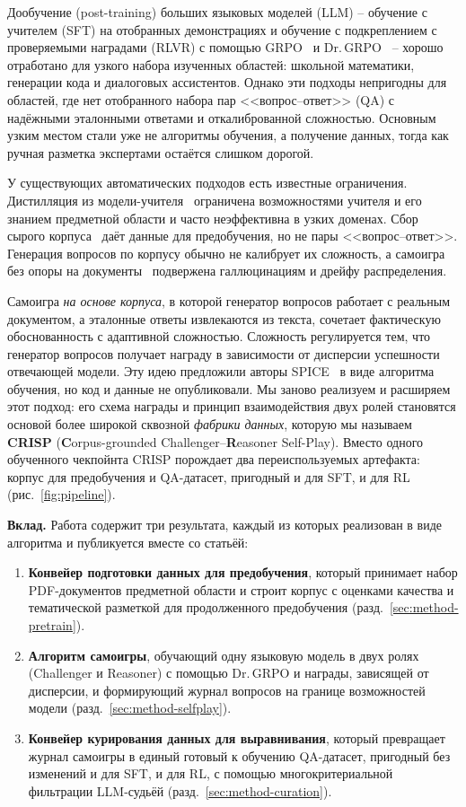 \documentclass{article}
\begin{document}
Дообучение (post-training) больших языковых моделей (LLM) -- обучение с учителем (SFT) на отобранных демонстрациях и обучение с подкреплением с проверяемыми наградами (RLVR) с помощью GRPO~\cite{shao2024deepseekmath} и Dr.\,GRPO~\cite{liu2025drgrpo} -- хорошо отработано для узкого набора изученных областей: школьной математики, генерации кода и диалоговых ассистентов. Однако эти подходы непригодны для областей, где нет отобранного набора пар <<вопрос--ответ>> (QA) с надёжными эталонными ответами и откалиброванной сложностью. Основным узким местом стали уже не алгоритмы обучения, а получение данных, тогда как ручная разметка экспертами остаётся слишком дорогой.

У существующих автоматических подходов есть известные ограничения. Дистилляция из модели-учителя~\cite{wang2022selfinstruct,xu2023wizardlm,luo2023wizardmath} ограничена возможностями учителя и его знанием предметной области и часто неэффективна в узких доменах. Сбор сырого корпуса~\cite{penedo2024fineweb} даёт данные для предобучения, но не пары <<вопрос--ответ>>. Генерация вопросов по корпусу обычно не калибрует их сложность, а самоигра без опоры на документы~\cite{huang2025rzero,zhao2025absolute} подвержена галлюцинациям и дрейфу распределения.

Самоигра \emph{на основе корпуса}, в которой генератор вопросов работает с реальным документом, а эталонные ответы извлекаются из текста, сочетает фактическую обоснованность с адаптивной сложностью. Сложность регулируется тем, что генератор вопросов получает награду в зависимости от дисперсии успешности отвечающей модели. Эту идею предложили авторы SPICE~\cite{spice} в виде алгоритма обучения, но код и данные не опубликовали. Мы заново реализуем и расширяем этот подход: его схема награды и принцип взаимодействия двух ролей становятся основой более широкой сквозной \emph{фабрики данных}, которую мы называем \textbf{CRISP} (\textbf{C}orpus-grounded Challenger--\textbf{R}easoner Self-Play). Вместо одного обученного чекпойнта CRISP порождает два переиспользуемых артефакта: корпус для предобучения и QA-датасет, пригодный и для SFT, и для RL (рис.~\ref{fig:pipeline}).

\textbf{Вклад.} Работа содержит три результата, каждый из которых реализован в виде алгоритма и публикуется вместе со статьёй:
\begin{enumerate}
    \item \textbf{Конвейер подготовки данных для предобучения}, который принимает набор PDF-документов предметной области и строит корпус с оценками качества и тематической разметкой для продолженного предобучения (разд.~\ref{sec:method-pretrain}).
    \item \textbf{Алгоритм самоигры}, обучающий одну языковую модель в двух ролях (Challenger и Reasoner) с помощью Dr.\,GRPO и награды, зависящей от дисперсии, и формирующий журнал вопросов на границе возможностей модели (разд.~\ref{sec:method-selfplay}).
    \item \textbf{Конвейер курирования данных для выравнивания}, который превращает журнал самоигры в единый готовый к обучению QA-датасет, пригодный без изменений и для SFT, и для RL, с помощью многокритериальной фильтрации LLM-судьёй (разд.~\ref{sec:method-curation}).
\end{enumerate}
\end{document}
